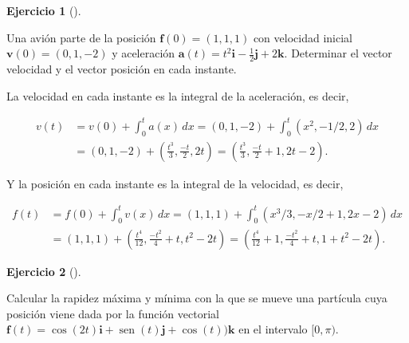 \documentclass[
  spanish,
  a4paper,
]{scrreport}
\theoremstyle{definition}
\newtheorem{exercise}{Ejercicio}[chapter]
\theoremstyle{remark}
\begin{document}
\begin{exercise}[]\protect\hypertarget{exr-cinematica-avion}{}\label{exr-cinematica-avion}

Una avión parte de la posición \(\mathbf{f}(0)=(1, 1, 1)\) con velocidad
inicial \(\mathbf{v}(0)=(0,1,-2)\) y aceleración
\(\mathbf{a}(t)=t^2\mathbf{i}-\frac{1}{2}\mathbf{j}+2\mathbf{k}\).
Determinar el vector velocidad y el vector posición en cada instante.

\end{exercise}

\begin{tcolorbox}[enhanced jigsaw, arc=.35mm, bottomrule=.15mm, bottomtitle=1mm, breakable, colback=white, colbacktitle=quarto-callout-tip-color!10!white, colframe=quarto-callout-tip-color-frame, coltitle=black, left=2mm, leftrule=.75mm, opacityback=0, opacitybacktitle=0.6, rightrule=.15mm, title=\textcolor{quarto-callout-tip-color}{\faLightbulb}\hspace{0.5em}{Solución}, titlerule=0mm, toprule=.15mm, toptitle=1mm]

La velocidad en cada instante es la integral de la aceleración, es
decir,

\begin{align*}
v(t) 
&= v(0) + \int_0^t a(x)\,dx 
= (0,1,-2) + \int_0^t (x^2,-1/2,2)\,dx \\
&= (0,1,-2) + (\frac{t^3}{3},\frac{-t}{2},2t) 
= \left(\frac{t^3}{3},\frac{-t}{2}+1,2t-2\right).
\end{align*}

Y la posición en cada instante es la integral de la velocidad, es decir,

\begin{align*}
f(t) 
&= f(0) + \int_0^t v(x)\,dx 
= (1,1,1) + \int_0^t (x^3/3,-x/2+1,2x-2)\,dx \\
&= (1,1,1) + (\frac{t^4}{12},\frac{-t^2}{4}+t, t^2-2t)
= \left(\frac{t^4}{12}+1,\frac{-t^2}{4}+t,1+t^2-2t\right).
\end{align*}

\end{tcolorbox}

\begin{exercise}[]\protect\hypertarget{exr-cinematica}{}\label{exr-cinematica}

Calcular la rapidez máxima y mínima con la que se mueve una partícula
cuya posición viene dada por la función vectorial
\(\mathbf{f}(t) = \cos(2t)\mathbf{i} + \operatorname{sen}(t)\mathbf{j} + \cos(t))\mathbf{k}\)
en el intervalo \([0,\pi)\).

\end{exercise}
\end{document}
